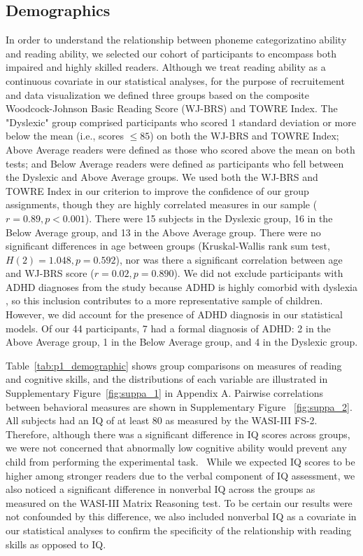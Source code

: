 \documentclass[../uwthesis.tex]{subfiles}
\begin{document}
\subsection{Demographics}

In order to understand the relationship between phoneme categorizatino ability and reading ability, we selected our cohort of participants to encompass both impaired and highly skilled readers. Although we treat reading ability as a continuous covariate in our statistical analyses, for the purpose of recruitement and data visualization we defined three groups based on the composite Woodcock-Johnson Basic Reading Score (WJ-BRS) and TOWRE Index. The "Dyslexic" group comprised participants who scored 1 standard deviation or more below the mean (i.e., scores $\leq 85$) on both the WJ-BRS and TOWRE Index; Above Average readers were defined as those who scored above the mean on both tests; and Below Average readers were defined as participants who fell between the Dyslexic and Above Average groups. We used both the WJ-BRS and TOWRE Index in our criterion to improve the confidence of our group assignments, though they are highly correlated measures in our sample ($r=0.89,p<0.001$). There were 15 subjects in the Dyslexic group, 16 in the Below Average group, and 13 in the Above Average group. There were no significant differences in age between groups (Kruskal-Wallis rank sum test, $H(2)=1.048,p=0.592$), nor was there a significant correlation between age and WJ-BRS score ($r=0.02,p=0.890$). We did not exclude participants with ADHD diagnoses from the study because ADHD is highly comorbid with dyslexia \citep{Light1995,Stevenson2005}, so this inclusion contributes to a more representative sample of children. However, we did account for the presence of ADHD diagnosis in our statistical models. Of our 44 participants, 7 had a formal diagnosis of ADHD: 2 in the Above Average group, 1 in the Below Average group, and 4 in the Dyslexic group. 

Table~\ref{tab:p1_demographic} shows group comparisons on measures of reading and cognitive skills, and the distributions of each variable are illustrated in Supplementary Figure~\ref{fig:suppa_1} in Appendix A. Pairwise correlations between behavioral measures are shown in Supplementary Figure ~\ref{fig:suppa_2}. All subjects had an IQ of at least 80 as measured by the WASI-III FS-2. Therefore, although there was a significant difference in IQ scores across groups, we were not concerned that abnormally low cognitive ability would prevent any child from performing the experimental task.  While we expected IQ scores to be higher among stronger readers due to the verbal component of IQ assessment, we also noticed a significant difference in nonverbal IQ across the groups as measured on the WASI-III Matrix Reasoning test. To be certain our results were not confounded by this difference, we also included nonverbal IQ as a covariate in our statistical analyses to confirm the specificity of the relationship with reading skills as opposed to IQ.
\end{document}
